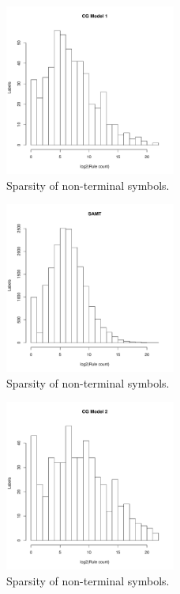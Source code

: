 \documentclass[a4paper]{article}
\begin{document}
\begin{figure}[t]
\includegraphics[width=0.5\textwidth]{figures/ccg}
\caption{Sparsity of non-terminal symbols.}
\end{figure}

\begin{figure}[t]
\includegraphics[width=0.5\textwidth]{figures/samt}
\caption{Sparsity of non-terminal symbols.}
\end{figure}

\begin{figure}[t]
\includegraphics[width=0.5\textwidth]{figures/ccg-auli}
\caption{Sparsity of non-terminal symbols.\label{fig:hist4}}
\end{figure}
\end{document}
